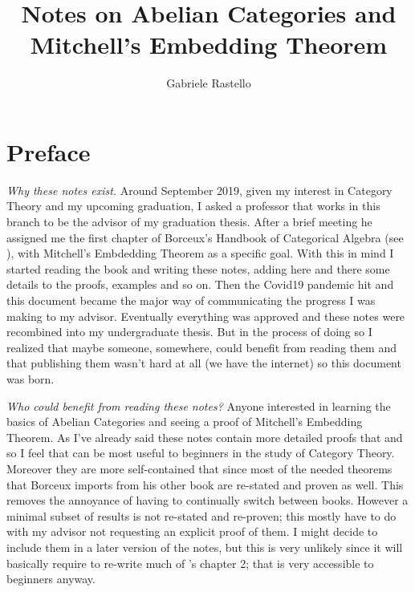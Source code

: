 \documentclass[12pt, english, reqno]{article}
\theoremstyle{myteo}
\begin{document}

\title{Notes on Abelian Categories and Mitchell's Embedding Theorem}
\author{Gabriele Rastello}
\maketitle
\tableofcontents

\newpage
\section*{Preface}


\medskip\noindent\emph{Why these notes exist.}
Around September 2019, given my interest in Category Theory and my upcoming graduation, I asked a professor that works in this branch to be the advisor of my graduation thesis.
After a brief meeting he assigned me the first chapter of Borceux's Handbook of Categorical Algebra (see \cite{handbook2}), with Mitchell's Embdedding Theorem as a specific goal.
With this in mind I started reading the book and writing these notes, adding here and there some details to the proofs, examples and so on.
Then the Covid19 pandemic hit and this document became the major way of communicating the progress I was making to my advisor.
Eventually everything was approved and these notes were recombined into my undergraduate thesis.
But in the process of doing so I realized that maybe someone, somewhere, could benefit from reading them and that publishing them wasn't hard at all (we have the internet) so this document was born.

\medskip\noindent\emph{Who could benefit from reading these notes?}
Anyone interested in learning the basics of Abelian Categories and seeing a proof of Mitchell's Embedding Theorem.
As I've already said these notes contain more detailed proofs that \cite{handbook2} and so I feel that can be most useful to beginners in the study of Category Theory.
Moreover they are more self-contained that \cite{handbook2} since most of the needed theorems that Borceux imports from his other book are re-stated and proven as well.
This removes the annoyance of having to continually switch between books.
However a minimal subset of results is not re-stated and re-proven; this mostly have to do with my advisor not requesting an explicit proof of them.
I might decide to include them in a later version of the notes, but this is very unlikely since it will basically require to re-write much of \cite{handbook1}'s chapter 2; that is very accessible to beginners anyway.
\end{document}
